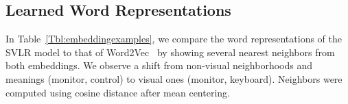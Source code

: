 \subsection{Learned Word Representations}
In Table~\ref{Tbl:embeddingexamples}, we compare the word representations of the SVLR model to that of Word2Vec~\cite{word2vec} by showing several nearest neighbors from both embeddings. We observe a shift from non-visual neighborhoods and meanings (monitor, control) to visual ones (monitor, keyboard). Neighbors were computed using cosine distance after mean centering. 



